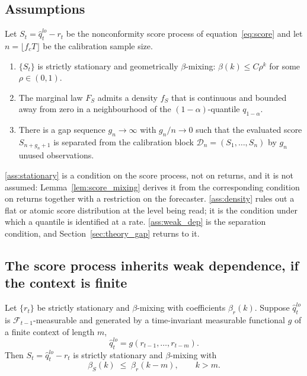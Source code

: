 \subsection{Assumptions}
\label{sec:theory_assumptions}

\begin{assumption}
	\label{ass:main}
	Let $S_t = \hat q_t^{lo} - r_t$ be the nonconformity score process of
	equation~\eqref{eq:score} and let $n = \lfloor f_c T\rfloor$ be the
	calibration sample size.
	\begin{enumerate}[label=\textup{(A\arabic*)},leftmargin=2.6em]
		\item\label{ass:stationary} $\{S_t\}$ is strictly stationary and
		geometrically $\beta$-mixing: $\beta(k)\le C\rho^{k}$ for some
		$\rho\in(0,1)$.
		\item\label{ass:density} The marginal law $F_S$ admits a density $f_S$
		that is continuous and bounded away from zero in a neighbourhood of the
		$(1-\alpha)$-quantile $q_{1-\alpha}$.
		\item\label{ass:weak_dep} There is a gap sequence $g_n\to\infty$ with
		$g_n/n\to 0$ such that the evaluated score $S_{n+g_n+1}$ is separated
		from the calibration block $\mathcal D_n = (S_1,\dots,S_n)$ by $g_n$
		unused observations.
	\end{enumerate}
\end{assumption}

\ref{ass:stationary} is a condition on the score process, not on returns, and it
is not assumed: Lemma~\ref{lem:score_mixing} derives it from the corresponding
condition on returns together with a restriction on the forecaster.
\ref{ass:density} rules out a flat or atomic score distribution at the level
being read; it is the condition under which a quantile is identified at a rate.
\ref{ass:weak_dep} is the separation condition, and Section~\ref{sec:theory_gap}
returns to it.

\subsection{The score process inherits weak dependence, if the context is finite}
\label{sec:theory_lemmas}

\begin{lemma}
	\label{lem:score_mixing}
	Let $\{r_t\}$ be strictly stationary and $\beta$-mixing with coefficients
	$\beta_r(k)$. Suppose $\hat q_t^{lo}$ is $\mathcal F_{t-1}$-measurable and
	generated by a time-invariant measurable functional $g$ of a finite context
	of length $m$,
	\begin{equation}
		\label{eq:forecast_functional}
		\hat q_t^{lo} = g(r_{t-1},\dots,r_{t-m}).
	\end{equation}
	Then $S_t = \hat q_t^{lo} - r_t$ is strictly stationary and $\beta$-mixing
	with
	\begin{equation}
		\label{eq:score_mixing_bound}
		\beta_S(k)\;\le\;\beta_r(k-m),\qquad k>m.
	\end{equation}
\end{lemma}

